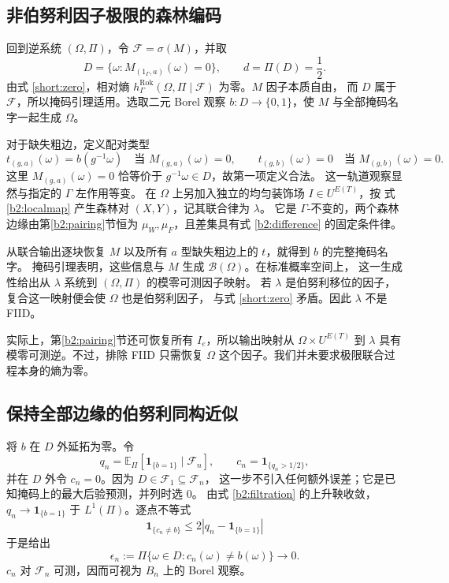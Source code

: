 \documentclass[UTF8,zihao=-4,a4paper]{ctexart}
\numberwithin{equation}{section}
\newcommand{\EE}{\mathbb E}
\begin{document}
\subsection{非伯努利因子极限的森林编码}\label{b2:limitconstruction}

回到逆系统 $(\Omega,\Pi)$，令 $\mathcal F=\sigma(M)$，并取
\begin{equation}\label{b2:forestmasks}
 D=\{\omega:M_{(1_\Gamma,a)}(\omega)=0\},\qquad d=\Pi(D)=\frac12.
\end{equation}
由式 \eqref{short:zero}，相对熵
$h^{\mathrm{Rok}}_\Gamma(\Omega,\Pi\mid\mathcal F)$ 为零。$M$ 因子本质自由，
而 $D$ 属于 $\mathcal F$，所以掩码引理适用。选取二元 Borel 观察
$b:D\to\{0,1\}$，使 $M$ 与全部掩码名字一起生成 $\Omega$。

对于缺失粗边，定义配对类型
\begin{equation}\label{b2:types}
 t_{(g,a)}(\omega)=b(g^{-1}\omega)\quad\text{当 }M_{(g,a)}(\omega)=0,
 \qquad
 t_{(g,b)}(\omega)=0\quad\text{当 }M_{(g,b)}(\omega)=0.
\end{equation}
这里 $M_{(g,a)}(\omega)=0$ 恰等价于 $g^{-1}\omega\in D$，故第一项定义合法。
这一轨道观察显然与指定的 $\Gamma$ 左作用等变。
在 $\Omega$ 上另加入独立的均匀装饰场 $I\in U^{E(T)}$，按
式 \eqref{b2:localmap} 产生森林对 $(X,Y)$，记其联合律为 $\lambda$。
它是 $\Gamma$-不变的，两个森林边缘由第\ref{b2:pairing}节恒为
$\mu_W,\mu_F$，且差集具有式 \eqref{b2:difference} 的固定条件律。

从联合输出逐块恢复 $M$ 以及所有 $a$ 型缺失粗边上的 $t$，就得到 $b$ 的完整掩码名字。
掩码引理表明，这些信息与 $M$ 生成 $\mathcal B(\Omega)$。在标准概率空间上，
这一生成性给出从 $\lambda$ 系统到 $(\Omega,\Pi)$ 的模零可测因子映射。
若 $\lambda$ 是伯努利移位的因子，复合这一映射便会使 $\Omega$ 也是伯努利因子，
与式 \eqref{short:zero} 矛盾。因此 $\lambda$ 不是 FIID。

实际上，第\ref{b2:pairing}节还可恢复所有 $I_e$，所以输出映射从
$\Omega\times U^{E(T)}$ 到 $\lambda$ 具有模零可测逆。不过，排除 FIID 只需恢复
$\Omega$ 这个因子。我们并未要求极限联合过程本身的熵为零。

\subsection{保持全部边缘的伯努利同构近似}\label{b2:approximation}

将 $b$ 在 $D$ 外延拓为零。令
\[
 q_n=\EE_\Pi[\mathbf1_{\{b=1\}}\mid\mathcal F_n],\qquad
 c_n=\mathbf1_{\{q_n>1/2\}},
\]
并在 $D$ 外令 $c_n=0$。因为 $D\in\mathcal F_1\subseteq\mathcal F_n$，
这一步不引入任何额外误差；它是已知掩码上的最大后验预测，并列时选 $0$。
由式 \eqref{b2:filtration} 的上升鞅收敛，
$q_n\to\mathbf1_{\{b=1\}}$ 于 $L^1(\Pi)$。逐点不等式
\[
 \mathbf1_{\{c_n\ne b\}}\le2|q_n-\mathbf1_{\{b=1\}}|
\]
于是给出
\begin{equation}\label{b2:prediction}
 \epsilon_n:=\Pi\{\omega\in D:c_n(\omega)\ne b(\omega)\}\longrightarrow0.
\end{equation}
$c_n$ 对 $\mathcal F_n$ 可测，因而可视为 $B_n$ 上的 Borel 观察。
\end{document}
